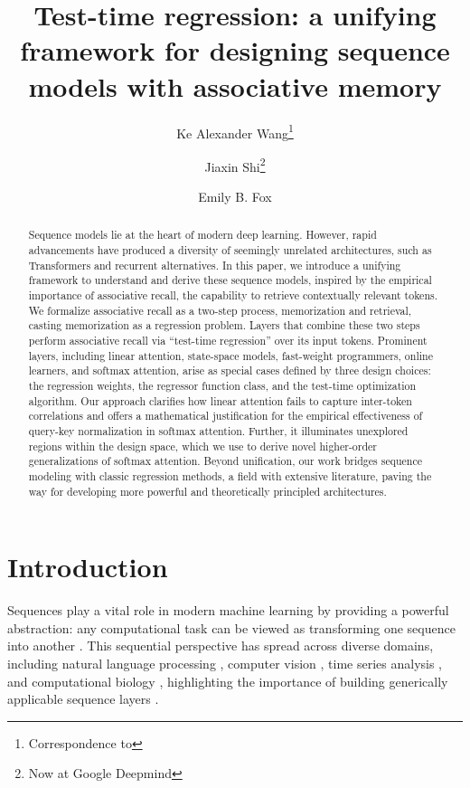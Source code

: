 \documentclass[notitlepage, 11pt]{article}
\title{Test-time regression: a unifying framework for designing sequence models with associative memory}
\author[$^1$]{Ke Alexander Wang\footnote{Correspondence to \email{alxwang@cs.stanford.edu}}}
\author[$^2$]{Jiaxin Shi\footnote{Now at Google Deepmind}}
\author[$^1$$^2$]{Emily B. Fox}
\affil[$^1$]{
  Department of Computer Science, Stanford University
}
\affil[$^2$]{
  Department of Statistics, Stanford University
}
\date{}
\begin{document}
\maketitle

\begin{abstract}

Sequence models lie at the heart of modern deep learning. However, rapid advancements have produced a diversity of seemingly unrelated architectures, such as Transformers and recurrent alternatives. In this paper, we introduce a unifying framework to understand and derive these sequence models, inspired by the empirical importance of associative recall, the capability to retrieve contextually relevant tokens. We formalize associative recall as a two-step process, memorization and retrieval, casting memorization as a regression problem. Layers that combine these two steps perform associative recall via ``test-time regression'' over its input tokens. Prominent layers, including linear attention, state-space models, fast-weight programmers, online learners, and softmax attention, arise as special cases defined by three design choices: the regression weights, the regressor function class, and the test-time optimization algorithm. Our approach clarifies how linear attention fails to capture inter-token correlations and offers a mathematical justification for the empirical effectiveness of query-key normalization in softmax attention. Further, it illuminates unexplored regions within the design space, which we use to derive novel higher-order generalizations of softmax attention. Beyond unification, our work bridges sequence modeling with classic regression methods, a field with extensive literature, paving the way for developing more powerful and theoretically principled architectures.

\end{abstract}

\section{Introduction}\label{sec:introduction}

Sequences play a vital role in modern machine learning by providing a powerful abstraction: any computational task can be viewed as transforming one sequence into another \citep{Sutskever2014SequenceSequenceLearning}.
This sequential perspective has spread across diverse domains, including natural language processing  \citep{Sutskever2014SequenceSequenceLearning,Devlin2019BERTPretrainingDeep,Brown2020LanguageModelsAre}, computer vision \citep{Dosovitskiy2021ImageWorth16x16,Bertasius2021SpaceTimeAttentionAll}, time series analysis \citep{Salinas2020DeepARProbabilisticForecasting,Gruver2023LargeLanguageModels,Ansari2024ChronosLearningLanguage}, and computational biology \citep{Jumper2021HighlyAccurateProtein,Zhou2015PredictingEffectsNoncoding,Nguyen2024SequenceModelingDesign}, highlighting the importance of building generically applicable sequence layers \citep{Vaswani2017AttentionAllYou}.
\end{document}
